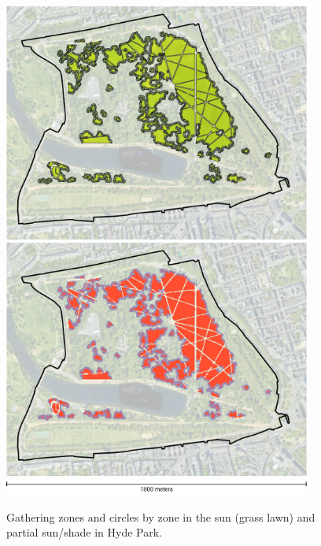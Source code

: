 \begin{figure}[H]
  \centering
  \captionsetup{width=0.9\textwidth}
  \includegraphics[width=0.9\textwidth]{images/gatherings/hyde_locations.png} \\
  \vspace{10pt}
  \includegraphics[width=0.9\textwidth]{images/gatherings/hyde_circles.png} \\
  \vspace{10pt}
  \includegraphics[width=0.9\textwidth]{images/gatherings/scale_legend_2.png}
  \caption[Hyde Park - gathering zones and circles]{Gathering zones and circles by zone in the sun (grass lawn) and partial sun/shade in Hyde Park.}
  \label{fig:hyde_gathering}
\end{figure}

